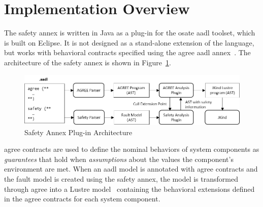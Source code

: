 \section{Implementation Overview}
\label{sec:implementation}

The safety annex is written in Java as a plug-in for the \gls{osate} \gls{aadl} toolset, which is built on Eclipse.  It is not designed as a stand-alone extension of the language, but works with behavioral contracts specified using the \gls{agree} \gls{aadl} annex~\cite{NFM2012:CoGaMiWhLaLu}. 
The architecture of the safety annex is shown in Figure~\ref{fig:plugin-arch}.

\begin{figure}
	\begin{centering}
		\includegraphics[width=\textwidth]{images/arch.png}
	\caption{Safety Annex Plug-in Architecture}
	\label{fig:plugin-arch}
	\end{centering}
\end{figure}

\gls{agree} contracts are used to define the nominal behaviors of system components as {\em guarantees} that hold when {\em assumptions} about the values the component's environment are met. When an \gls{aadl} model is annotated with \gls{agree} contracts and the fault model is created using the safety annex, the model is transformed through \gls{agree} into a Lustre model~\cite{Halbwachs91:IEEE} containing the behavioral extensions defined in the \gls{agree} contracts for each system component. 


